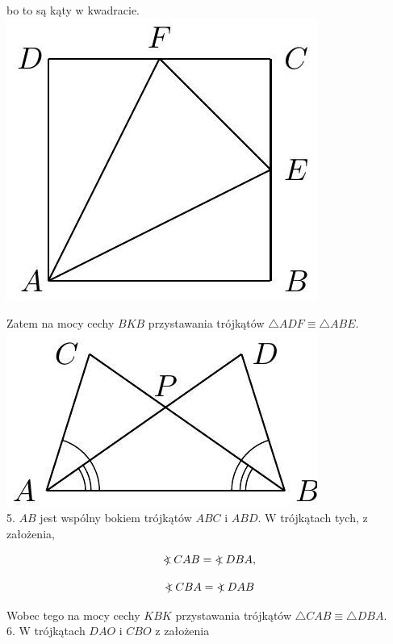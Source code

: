 \documentclass[10pt]{article}
\newcommand\Varangle{\mathop{{<\!\!\!\!\!\text{\small)}}\:}\nolimits}
\begin{document}
bo to są kąty w kwadracie.\\
\includegraphics[max width=\textwidth, center]{2024_11_21_71f62bd117d375398909g-059(2)}

Zatem na mocy cechy \(B K B\) przystawania trójkątów \(\triangle A D F \equiv \triangle A B E\).\\
\includegraphics[max width=\textwidth, center]{2024_11_21_71f62bd117d375398909g-059}\\
5. \(A B\) jest wspólny bokiem trójkątów \(A B C\) i \(A B D\). W trójkątach tych, z założenia,

\[
\Varangle C A B=\Varangle D B A,
\]

\[
\Varangle C B A=\Varangle D A B
\]

Wobec tego na mocy cechy \(K B K\) przystawania trójkątów \(\triangle C A B \equiv \triangle D B A\).\\
6. W trójkątach \(D A O\) i \(C B O\) z założenia
\end{document}
